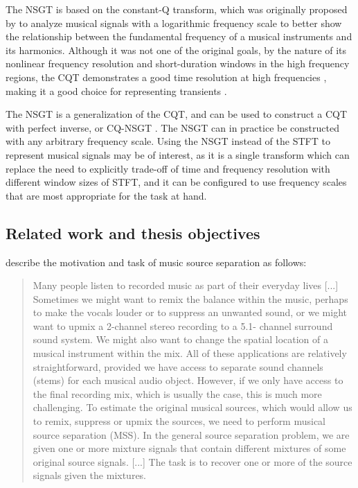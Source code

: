 \documentclass[letter,12pt,notitlepage]{article}
\begin{document}
The NSGT is based on the constant-Q transform, which was originally proposed by \textcite{jbrown} to analyze musical signals with a logarithmic frequency scale to better show the relationship between the fundamental frequency of a musical instruments and its harmonics. Although it was not one of the original goals, by the nature of its nonlinear frequency resolution and short-duration windows in the high frequency regions, the CQT demonstrates a good time resolution at high frequencies \cite{cqtransient}, making it a good choice for representing transients .

The NSGT is a generalization of the CQT, and can be used to construct a CQT with perfect inverse, or CQ-NSGT \cite{invertiblecqt, variableq1}. The NSGT can in practice be constructed with any arbitrary frequency scale. Using the NSGT instead of the STFT to represent musical signals may be of interest, as it is a single transform which can replace the need to explicitly trade-off of time and frequency resolution with different window sizes of STFT, and it can be configured to use frequency scales that are most appropriate for the task at hand.

\subsection{Related work and thesis objectives}


\textcite{musicsepgood} describe the motivation and task of music source separation as follows:

\begin{quote}
	Many people listen to recorded music as part of their everyday lives [...] Sometimes we might want to remix the balance within the music, perhaps to make the vocals louder or to suppress an unwanted sound, or we might want to upmix a 2-channel stereo recording to a 5.1- channel surround sound system. We might also want to change the spatial location of a musical instrument within the mix. All of these applications are relatively straightforward, provided we have access to separate sound channels (stems) for each musical audio object. However, if we only have access to the final recording mix, which is usually the case, this is much more challenging. To estimate the original musical sources, which would allow us to remix, suppress or upmix the sources, we need to perform musical source separation (MSS). In the general source separation problem, we are given one or more mixture signals that contain different mixtures of some original source signals. [...] The task is to recover one or more of the source signals given the mixtures.
\end{quote}
\end{document}
